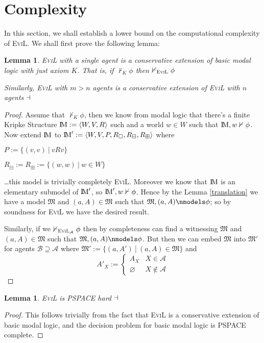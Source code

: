 \documentclass[11pt]{article}
\numberwithin{equation}{subsection}
\newtheorem{lemma}[theorem]{Lemma}
\newcommand{\Nec}{\Box}
\newcommand{\BB}{\boxminus}
\newcommand{\BBI}{\boxplus}
\begin{document}
\section{Complexity}

In this section, we shall establish a lower bound on the computational complexity of \textsc{EviL}.  We shall first prove the following lemma:

\begin{lemma}
\textsc{EviL} with a single agent is a conservative extension of basic modal logic with just axiom $K$.  That is, if $\nvdash_K \phi$ then $\nvdash_{\textup{\textsc{EviL}}} \phi$

Similarly, \textsc{EviL} with $m > n$ agents is a conservative extension of \textsc{EviL} with $n$ agents $\hfill\dashv$
\end{lemma}
\begin{proof}
Assume that $\nvdash_K \phi$, then we know from modal logic that there's a finite Kripke Structure $\bbM := \langle W, V, R\rangle$ such and a world $w \in W$ such that $\bbM,w \nvdash \phi$.  Now extend $\bbM$ to $\bbM' := \langle W, V, P, R_\Nec, R_\BB, R_\BBI \rangle$ where
\begin{bul}
	\item $P := \{(v,v)\ |\ v R v\}$
	\item $R_\BB := R_\BBI := \{(w,w)\ |\ w \in W\}$
\end{bul}
\ldots this model is trivially completely \textsc{EviL}. Moreover we know that $\bbM$ is an elementary submodel of $\bbM'$, so $\bbM', w\nvdash \phi$.  Hence by the Lemma \ref{translation} we have a model $\mathfrak{M}$ and $(a,A) \in \mathfrak{M}$ such that $\mathfrak{M},(a,A) \nmodels \phi$; so by soundness for \textsc{EviL} we have the desired result.

Similarly, if we $\nvdash_{\textup{\textsc{EviL}}_\mathcal{A}} \phi$ then by completeness can find a witnessing $\mathfrak{M}$ and $(a,A) \in \mathfrak{M}$ such that $\mathfrak{M},(a,A) \nmodels \phi$.  But then we can embed $\mathfrak{M}$ into $\mathfrak{M}'$ for agents $\mathcal{B} \supseteq \mathcal{A}$ where $\mathfrak{M}' := \{(a,A') \ |\ (a,A) \in \mathfrak{M}\}$ and
$$ A'_X := \begin{cases} A_X & X \in\mathcal{A} \\ \varnothing & X \nin \mathcal{A}\end{cases} $$
\end{proof}

\begin{lemma}
	\textsc{EviL} is \textsf{PSPACE} hard $\hfill\dashv$
\end{lemma}
\begin{proof}
This follows trivially from the fact that \textsc{EviL} is a conservative extension of basic modal logic, and the decision problem for basic modal logic is \textsf{PSPACE} complete.
\end{proof}

\pagebreak
{}


\end{document}
